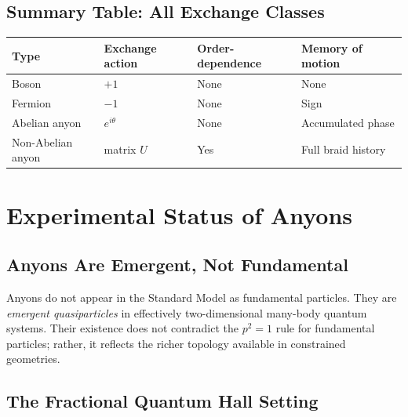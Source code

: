 \documentclass[11pt,a4paper]{article}
\begin{document}
\subsection{Summary Table: All Exchange Classes}

\begin{center}
\renewcommand{\arraystretch}{1.35}
\begin{tabular}{llll}
  \toprule
  Type & Exchange action & Order-dependence & Memory of motion \\
  \midrule
  Boson           & $+1$            & None      & None \\
  Fermion         & $-1$            & None      & Sign \\
  Abelian anyon   & $e^{i\theta}$   & None      & Accumulated phase \\
  Non-Abelian anyon & matrix $U$    & Yes       & Full braid history \\
  \bottomrule
\end{tabular}
\end{center}

\section{Experimental Status of Anyons}

\subsection{Anyons Are Emergent, Not Fundamental}

Anyons do not appear in the Standard Model as fundamental particles.  They are
\emph{emergent quasiparticles} in effectively two-dimensional many-body quantum
systems.  Their existence does not contradict the $p^2 = 1$ rule for
fundamental particles; rather, it reflects the richer topology available in
constrained geometries.

\subsection{The Fractional Quantum Hall Setting}
\end{document}
